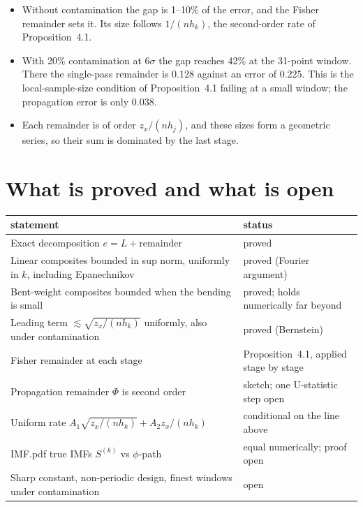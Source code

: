 \documentclass[11pt]{article}
\begin{document}
\begin{itemize}
\item Without contamination the gap is 1--10\% of the error, and the Fisher
  remainder sets it.  Its size follows \(1/(nh_k)\), the second-order rate of
  Proposition~4.1.
\item With 20\% contamination at \(6\sigma\) the gap reaches 42\% at the
  31-point window.  There the single-pass remainder is \(0.128\) against an
  error of \(0.225\).  This is the local-sample-size condition of
  Proposition~4.1 failing at a small window; the propagation error is only
  \(0.038\).
\item Each remainder is of order \(z_x/(nh_j)\), and these sizes form a
  geometric series, so their sum is dominated by the last stage.
\end{itemize}

\section{What is proved and what is open}

\begin{center}\small
\begin{tabular}{p{}p{}}
\toprule
statement & status\\
\midrule
Exact decomposition \(e=L+\text{remainder}\) & proved\\
Linear composites bounded in sup norm, uniformly in \(k\), including Epanechnikov & proved (Fourier argument)\\
Bent-weight composites bounded when the bending is small & proved; holds numerically far beyond\\
Leading term \(\lesssim\sqrt{z_x/(nh_k)}\) uniformly, also under contamination & proved (Bernstein)\\
Fisher remainder at each stage & Proposition~4.1, applied stage by stage\\
Propagation remainder \(\Phi\) is second order & sketch; one U-statistic step open\\
Uniform rate \(A_1\sqrt{z_x/(nh_k)}+A_2z_x/(nh_k)\) & conditional on the line above\\
IMF.pdf true IMFs \(S^{(k)}\) vs \(\phi\)-path & equal numerically; proof open\\
Sharp constant, non-periodic design, finest windows under contamination & open\\
\bottomrule
\end{tabular}
\end{center}
\end{document}
